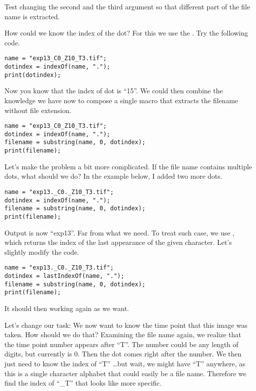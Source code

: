 \begin{indentexercise}{1}
Test changing the second and the third argument so that different part of the file name is extracted. 
\end{indentexercise}

How could we know the index of the dot? For this we use the . Try the following code. 

\begin{lstlisting}
name = "exp13_C0_Z10_T3.tif";
dotindex = indexOf(name, ".");
print(dotindex);
\end{lstlisting}

Now you know that the index of dot is ``15''. We could then combine the knowledge we have now to compose a single macro that extracts the filename without file extension. 

\begin{lstlisting}
name = "exp13_C0_Z10_T3.tif";
dotindex = indexOf(name, ".");
filename = substring(name, 0, dotindex);
print(filename);
\end{lstlisting}

Let's make the problem a bit more complicated. If the file name contains multiple dots, what should we do? In the example below, I added two more dots. 

\begin{lstlisting}
name = "exp13._C0._Z10_T3.tif";
dotindex = indexOf(name, ".");
filename = substring(name, 0, dotindex);
print(filename);
\end{lstlisting}

Output is now ``exp13''. Far from what we need. To treat such case, we use , which returns the index of the last appearance of the given character. Let's slightly modify the code. 

\begin{lstlisting}
name = "exp13._C0._Z10_T3.tif";
dotindex = lastIndexOf(name, ".");
filename = substring(name, 0, dotindex);
print(filename);
\end{lstlisting}

It should then working again as we want. 

Let's change our task: We now want to know the time point that this image was taken. How should we do that? Examining the file name again, we realize that the time point number appears after ``T''. The number could be any length of digits, but currently is 0. Then the dot comes right after the number. We then just need to know the index of ``T'' \ldots but wait, we might have ``T'' anywhere, as this is a single character alphabet that could easily be a file name. Therefore we find the index of ``\_T'' that looks like more specific. 

